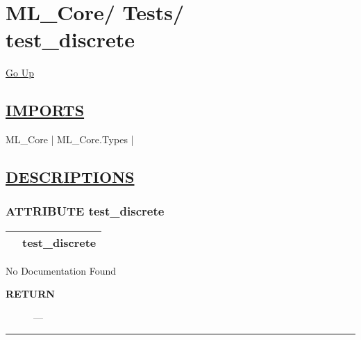 \chapter*{\color{headfile}
{\large ML\_Core\slash\hspace{0pt}}
{\large Tests\slash\hspace{0pt}}
 \\
test_discrete
}
\hypertarget{ecldoc:toc:ML_Core.Tests.test_discrete}{}
\hyperlink{ecldoc:toc:root/ML_Core/Tests}{Go Up}

\section*{\underline{\textsf{IMPORTS}}}
\begin{doublespace}
{\large
ML\_Core |
ML\_Core.Types |
}
\end{doublespace}

\section*{\underline{\textsf{DESCRIPTIONS}}}
\subsection*{\textsf{\colorbox{headtoc}{\color{white} ATTRIBUTE}
test\_discrete}}

\hypertarget{ecldoc:ml_core.tests.test_discrete}{}

{\renewcommand{\arraystretch}{1.5}
\begin{tabularx}{\textwidth}{|>{\raggedright\arraybackslash}l|X|}
\hline
\hspace{0pt}\mytexttt{\color{red} } & \textbf{test\_discrete} \\
\hline
\end{tabularx}
}

\par





No Documentation Found








\par
\begin{description}
\item [\colorbox{tagtype}{\color{white} \textbf{\textsf{RETURN}}}] \textbf{} --- 
\end{description}




\rule{\linewidth}{0.5pt}
